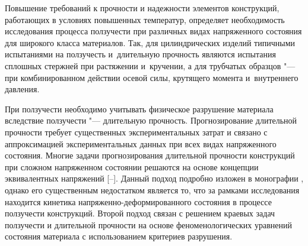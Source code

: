 \makerutitle

\newpage

Повышение требований к прочности и надежности элементов
конструкций, работающих в условиях повышенных температур, определяет необходимость исследования процесса ползучести при различных видах напряженного состояния для широкого класса материалов.
Так, для цилиндрических изделий типичными испытаниями на ползучесть и~длительную прочность являются испытания сплошных стержней при растяжении и~кручении, а для трубчатых образцов "--- при комбинированном действии осевой силы, крутящего момента и~внутреннего давления.


При ползучести необходимо  учитывать физическое разрушение материала вследствие ползучести "--- длительную прочность.
Прогнозирование длительной прочности требует существенных экспериментальных затрат и связано с аппроксимацией экспериментальных данных при всех видах напряженного состояния.
Многие задачи прогнозирования длительной прочности конструкций при сложном напряженном состоянии решаются на основе концепции эквивалентных напряжений [--]. 
Данный подход подробно изложен в монографии \cite{Lokoschenko}, однако его существенным недостатком является то, что за рамками исследования находится кинетика напряженно-деформированного состояния в процессе ползучести конструкций.
Второй подход связан с решением краевых задач ползучести и длительной прочности на основе феноменологических уравнений состояния материала с использованием критериев разрушения.



